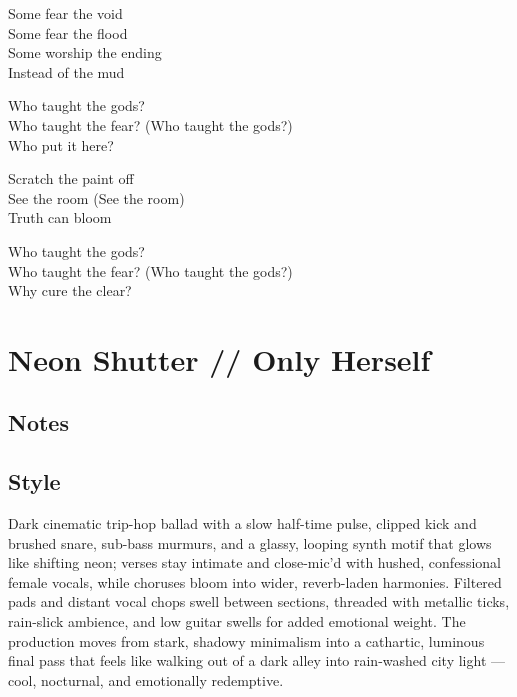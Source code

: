 \begin{lyrics}
Some fear the void\\
Some fear the flood\\
Some worship the ending\\
Instead of the mud

Who taught the gods?\\
Who taught the fear?
(Who taught the gods?)\\
Who put it here?

Scratch the paint off\\
See the room
(See the room)\\
Truth can bloom

Who taught the gods?\\
Who taught the fear?
(Who taught the gods?)\\
Why cure the clear?
\end{lyrics}

\section{Neon Shutter // Only Herself}
\subsection{Notes}
\subsection{Style}
Dark cinematic trip-hop ballad with a slow half-time pulse, clipped kick and brushed snare, sub-bass murmurs, and a glassy, looping synth motif that glows like shifting neon; verses stay intimate and close-mic’d with hushed, confessional female vocals, while choruses bloom into wider, reverb-laden harmonies. Filtered pads and distant vocal chops swell between sections, threaded with metallic ticks, rain-slick ambience, and low guitar swells for added emotional weight. The production moves from stark, shadowy minimalism into a cathartic, luminous final pass that feels like walking out of a dark alley into rain-washed city light — cool, nocturnal, and emotionally redemptive.

